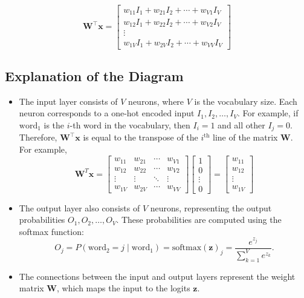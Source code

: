 \begin{notechapter}
\begin{minipage}[t]{.34\textwidth}
\[
\mathbf{W}^\top \mathbf{x} = 
\begin{bmatrix}
w_{11} I_1 + w_{21} I_2 + \cdots + w_{V1} I_V \\
w_{12} I_1 + w_{22} I_2 + \cdots + w_{V2} I_V \\
\vdots \\
w_{1V} I_1 + w_{2V} I_2 + \cdots + w_{VV} I_V
\end{bmatrix}
\]
\end{minipage}

\subsection{Explanation of the Diagram}
\begin{itemize}
    \item The input layer consists of \( V \) neurons, where \( V \) is the
          vocabulary size. Each neuron corresponds to a one-hot encoded input
          \( I_1, I_2, \dots, I_V \). For example, if \(\text{word}_1\) is the
          \(i\)-th word in the vocabulary, then \( I_i = 1 \) and all other
          \( I_j = 0 \).\\
          Therefore, $\mathbf{W}^\top \mathbf{x}$ is equal to the transpose
          of the $i^{\text{th}}$ line of the matrix $\mathbf{W}$.\\
          For example,
          \[
            \mathbf{W}^{T} \mathbf{x} = 
            \begin{bmatrix}
            w_{11} & w_{21} & \cdots & w_{V1} \\
            w_{12} & w_{22} & \cdots & w_{V2} \\
            \vdots & \vdots & \ddots & \vdots \\
            w_{1V} & w_{2V} & \cdots & w_{VV}
            \end{bmatrix}
            \begin{bmatrix}
                  1 \\
                  0 \\
                  \vdots \\
                  0
            \end{bmatrix} =
            \begin{bmatrix}
                  w_{11} \\ w_{12} \\ \vdots \\ w_{1V}
            \end{bmatrix}
            \]
    \item The output layer also consists of \( V \) neurons, representing the
          output probabilities \( O_1, O_2, \dots, O_V \). These probabilities
          are computed using the softmax function:
          \[
          O_j = P(\text{word}_2 = j \mid \text{word}_1) =
          \text{softmax}(\mathbf{z})_j = \frac{e^{z_j}}{\sum_{k=1}^V e^{z_k}}.
          \]
    \item The connections between the input and output layers represent the
          weight matrix \(\mathbf{W}\), which maps the input to the logits
          \(\mathbf{z}\).
\end{itemize}


\end{notechapter}
